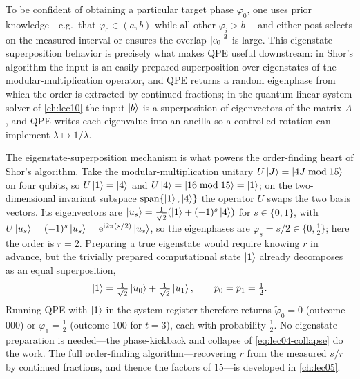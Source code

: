 \begin{remark}
\label{rem:lec04-target}
To be confident of obtaining a particular target phase $\varphi_0$, one uses
prior knowledge---e.g.\ that $\varphi_0\in(a,b)$ while all other $\varphi_i>b$---
and either post-selects on the measured interval or ensures the overlap
$\left\lvert c_0 \right\rvert^2$ is large. This eigenstate-superposition behavior is precisely what
makes QPE useful downstream: in Shor's algorithm the input is an easily prepared
superposition over eigenstates of the modular-multiplication operator, and QPE
returns a random eigenphase from which the order is extracted by continued
fractions; in the quantum linear-system solver of \cref{ch:lec10} the input
$\ket{b}$ is a superposition of eigenvectors of the matrix $A$, and QPE writes
each eigenvalue into an ancilla so a controlled rotation can implement
$\lambda\mapsto1/\lambda$.
\end{remark}

\begin{example}
\label{exa:lec04-order}
The eigenstate-superposition mechanism is what powers the order-finding heart of
Shor's algorithm. Take the modular-multiplication unitary
$U\ket{J}=\ket{4J\bmod 15}$ on four qubits, so $U\ket{1}=\ket{4}$ and
$U\ket{4}=\ket{16\bmod 15}=\ket{1}$; on the two-dimensional invariant subspace
$\mathrm{span}\{\ket{1},\ket{4}\}$ the operator $U$ swaps the two basis vectors.
Its eigenvectors are $\ket{u_s}=\tfrac{1}{\sqrt2}(\ket{1}+(-1)^{s}\ket{4})$ for
$s\in\{0,1\}$, with $U\ket{u_s}=(-1)^{s}\ket{u_s}=\mathrm{e}^{\mathrm{i} 2\pi(s/2)}\ket{u_s}$,
so the eigenphases are $\varphi_s=s/2\in\{0,\tfrac12\}$; here the order is
$r=2$. Preparing a true eigenstate would require knowing $r$ in advance, but the
trivially prepared computational state $\ket{1}$ already decomposes as an equal
superposition,
\[
  \ket{1}=\tfrac{1}{\sqrt2}\ket{u_0}+\tfrac{1}{\sqrt2}\ket{u_1},
  \qquad p_0=p_1=\tfrac12.
\]
Running QPE with $\ket{1}$ in the system register therefore returns
$\tilde\varphi_0=0$ (outcome $000$) or $\tilde\varphi_1=\tfrac12$ (outcome $100$
for $t=3$), each with probability $\tfrac12$. No eigenstate preparation is
needed---the phase-kickback and collapse of \cref{eq:lec04-collapse} do the work.
The full order-finding algorithm---recovering $r$ from the measured $s/r$ by
continued fractions, and thence the factors of $15$---is developed in
\cref{ch:lec05}.
\end{example}

